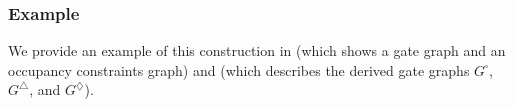 \documentclass[../thesis-main/thesis-main]{subfiles}
\begin{document}
\subsubsection*{Example}

We provide an example of this construction in  (which shows a gate graph and an occupancy constraints graph) and  (which describes the derived gate graphs $G^{\square}$, $G^{\triangle}$, and $G^{\diamondsuit}$).

%
%
\end{document}
